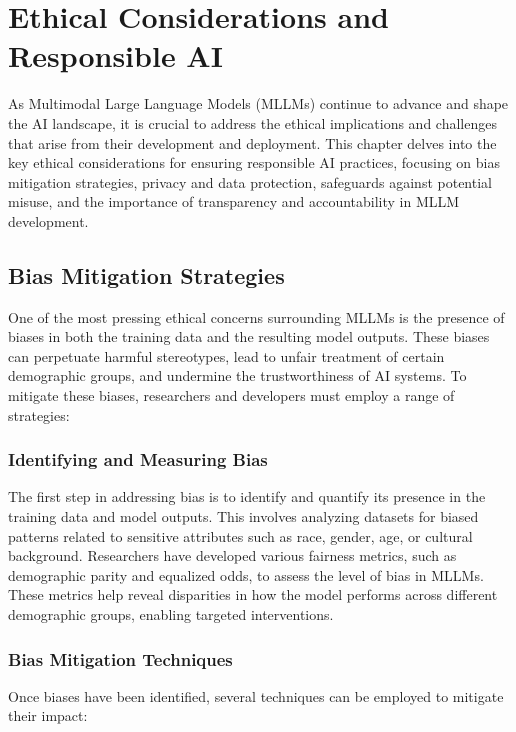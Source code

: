 \chapter{Ethical Considerations and Responsible AI}

As Multimodal Large Language Models (MLLMs) continue to advance and shape the AI landscape, it is crucial to address the ethical implications and challenges that arise from their development and deployment. This chapter delves into the key ethical considerations for ensuring responsible AI practices, focusing on bias mitigation strategies, privacy and data protection, safeguards against potential misuse, and the importance of transparency and accountability in MLLM development.

\section{Bias Mitigation Strategies}

One of the most pressing ethical concerns surrounding MLLMs is the presence of biases in both the training data and the resulting model outputs. These biases can perpetuate harmful stereotypes, lead to unfair treatment of certain demographic groups, and undermine the trustworthiness of AI systems. To mitigate these biases, researchers and developers must employ a range of strategies:

\subsection{Identifying and Measuring Bias}

The first step in addressing bias is to identify and quantify its presence in the training data and model outputs. This involves analyzing datasets for biased patterns related to sensitive attributes such as race, gender, age, or cultural background. Researchers have developed various fairness metrics, such as demographic parity and equalized odds, to assess the level of bias in MLLMs. These metrics help reveal disparities in how the model performs across different demographic groups, enabling targeted interventions.

\subsection{Bias Mitigation Techniques}

Once biases have been identified, several techniques can be employed to mitigate their impact:

